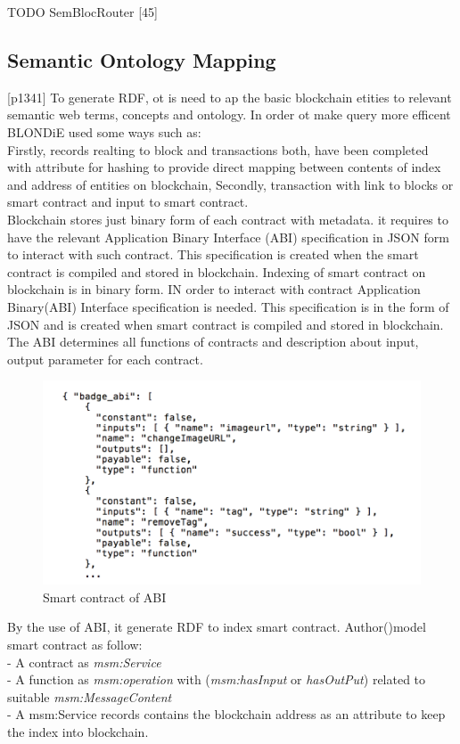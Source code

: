 TODO
SemBlocRouter [45]
\subsection{Semantic Ontology Mapping}[p1341]
To generate RDF, ot is need to ap the basic blockchain  etities to relevant semantic web terms, concepts and ontology. In order ot make query more efficent BLONDiE used some ways such as:\\  
Firstly, records realting to block and transactions both, have been completed with attribute for hashing to provide direct mapping between contents of index and address of entities on blockchain, Secondly, transaction with link to blocks or smart contract and input to smart contract.\\
Blockchain stores just binary form of each contract with metadata.   
it requires to have the relevant Application Binary Interface (ABI) specification in JSON form to interact with such contract. This specification is created when the smart contract is compiled and stored in blockchain. Indexing of smart contract on blockchain is in binary form. IN order to interact with contract Application Binary(ABI) Interface specification is needed. This specification is in the form of JSON and is created when smart contract is compiled and stored in blockchain. The ABI determines all functions of contracts and description about input, output parameter for each contract.
 
\begin{center}
	\begin{figure}[htb!]
		
		\begin{minipage}{0.55\linewidth}
			\centering
			\includegraphics[width=1.95\textwidth]{images/chap02_SmartContract_ABI.png}
		\end{minipage}
		\caption[Smart contract of ABI]{Smart  contract of ABI}
		
	\end{figure}
	
\end{center}
By the use of ABI, it generate RDF to index smart contract.
Author()model smart contract as follow:\\
- A contract as \textit{msm:Service}\\
- A function as \textit{msm:operation} with (\textit{msm:hasInput} or \textit{hasOutPut}) related to suitable \textit{msm:MessageContent}\\
- A msm:Service records contains the blockchain address as an attribute to keep the index into blockchain.
 

